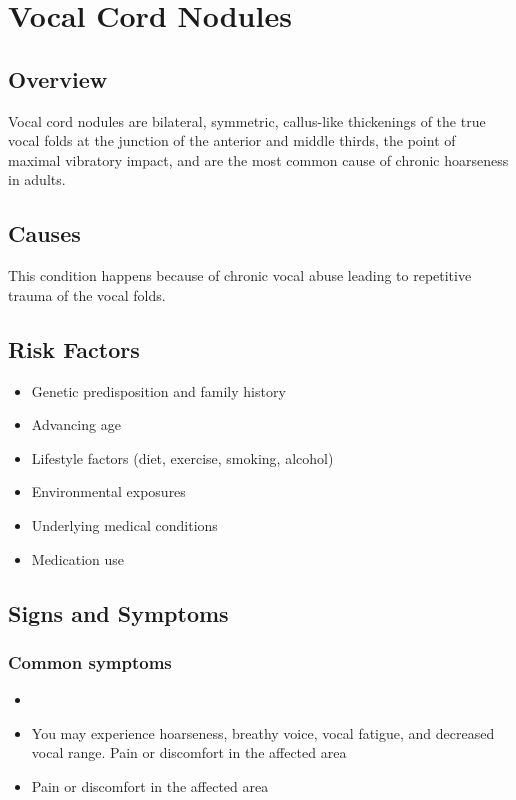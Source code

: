 \chapter{Vocal Cord Nodules}
\label{sec:Vocal Cord Nodules}

\section{Overview}
Vocal cord nodules are bilateral, symmetric, callus-like thickenings of the true vocal folds at the junction of the anterior and middle thirds, the point of maximal vibratory impact, and are the most common cause of chronic hoarseness in adults.
\section{Causes}
This condition happens because of chronic vocal abuse leading to repetitive trauma of the vocal folds.     
\section{Risk Factors}

\begin{itemize}[noitemsep]
  \item Genetic predisposition and family history
  \item Advancing age
  \item Lifestyle factors (diet, exercise, smoking, alcohol)
  \item Environmental exposures
  \item Underlying medical conditions
  \item Medication use
\end{itemize}
\section{Signs and Symptoms}

\subsection{Common symptoms}
\begin{itemize}[noitemsep]
  \item \item You may experience hoarseness, breathy voice, vocal fatigue, and decreased vocal range. Pain or discomfort in the affected area    \item Pain or discomfort in the affected area
  \end{itemize}

